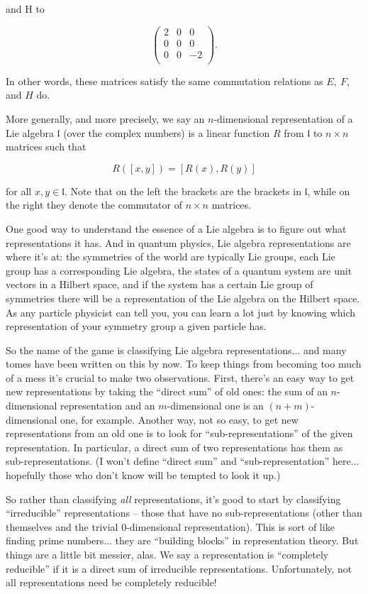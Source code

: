 \noindent and H to

\[\begin{pmatrix}
2 & 0 & 0 \\  
0 & 0 & 0 \\
0 & 0 &-2\\
\end{pmatrix}.\]

\noindent In other words, these matrices satisfy the same commutation relations as $E,\ F$, and $H$ do.

More generally, and more precisely, we say an $n$-dimensional representation of a Lie algebra $\mathfrak{l}$ (over the complex numbers) is a linear function $R$ from $\mathfrak{l}$ to $n \times n$ matrices such that

\[R([x,y]) = [R(x),R(y)]\]

for all $x,y \in \mathfrak{l}$.  Note that on the left the brackets are the brackets in $\mathfrak{l}$, while on the right they denote the commutator of $n \times n$ matrices.

One good way to understand the essence of a Lie algebra is to figure out what representations it has.  And in quantum physics, Lie algebra representations are where it's at: the symmetries of the world are typically Lie groups, each Lie group has a corresponding Lie algebra, the states of a quantum system are unit vectors in a Hilbert space, and if the system has a certain Lie group of symmetries there will be a representation of the Lie algebra on the Hilbert space.  As any particle physicist can tell you, you can learn a lot just by knowing which representation of your symmetry group a given particle has.

So the name of the game is classifying Lie algebra representations... and many tomes have been written on this by now.  To keep things from becoming too much of a mess it's crucial to make two observations.  First, there's an easy way to get new representations by taking the ``direct sum'' of old ones: the sum of an $n$-dimensional representation and an $m$-dimensional one is an $(n+m)$-dimensional one, for example.  Another way, not so easy, to get new representations from an old one is to look for ``sub-representations'' of the given representation.  In particular, a direct sum of two representations has them as sub-representations.  (I won't define ``direct sum'' and ``sub-representation'' here... hopefully those who don't know will be tempted to look it up.)

So rather than classifying \emph{all} representations, it's good to start by classifying ``irreducible'' representations -- those that have no sub-representations (other than themselves and the trivial 0-dimensional representation).  This is sort of like finding prime numbers... they are ``building blocks'' in representation theory.  But things are a little bit messier, alas.  We say a representation is ``completely reducible'' if it is a direct sum of irreducible representations.  Unfortunately, not all representations need be completely reducible!


